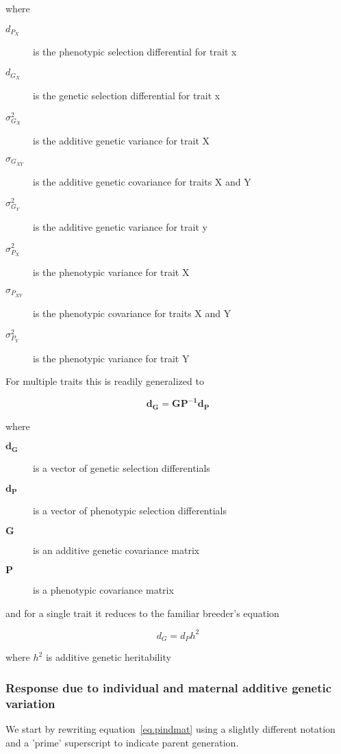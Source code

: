 \documentclass[titlepage]{article}  %
\begin{document}
where
\begin{description}
\item[$d_{P_{X}}$] is the phenotypic selection differential for trait x
\item[$d_{G_{X}}$] is the genetic selection differential for trait x
\item[$\sigma^{2}_{G_{X}}$] is the additive genetic variance for trait X
\item[$\sigma_{G_{XY}}$] is the additive genetic covariance for traits X and Y
\item[$\sigma^{2}_{G_{Y}}$] is the additive genetic variance for trait y
\item[$\sigma^{2}_{P_{X}}$] is the phenotypic variance for trait X
\item[$\sigma_{P_{XY}}$] is the phenotypic covariance for traits X and Y
\item[$\sigma^{2}_{P_{Y}}$] is the phenotypic variance for trait Y
\end{description}

For multiple traits this is readily generalized to 

\begin{equation}
\bm{d_{G} = G P^{-1} d_{P}}  \label{eq.mbe}
\end{equation}

where
\begin{description}
\item[$\bm{d_{G}}$] is a vector of genetic selection differentials
\item[$\bm{d_{P}}$] is a vector of phenotypic selection differentials
\item[$\bm{G}$] is an additive genetic covariance matrix
\item[$\bm{P}$] is a phenotypic covariance matrix
\end{description}

and for a single trait it reduces to the familiar breeder's equation

\begin{displaymath}
d_{G} = d_{P} h^{2}
\end{displaymath}
 
where $h^{2}$ is additive genetic heritability

\subsubsection{Response due to individual and maternal additive genetic variation}
\label{sec.maternal}
We start by rewriting equation~\ref{eq.pindmat} using a slightly different notation and a 'prime' superscript to indicate parent generation.
\end{document}
